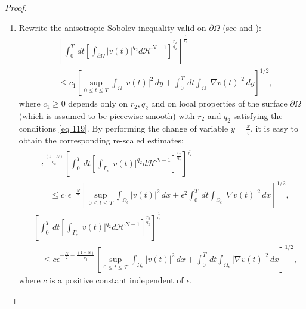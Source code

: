 \begin{proof}
\begin{enumerate}[label=(\roman*)]
\item Rewrite the anisotropic Sobolev inequality valid on $\partial \Omega$ (see \cite{Ladyzenskaja_Solonnikov_Uralceva_1968} and \cite{Nittka_2011}):
\begin{equation}
  \begin{aligned}
&{\left[\int_{0}^{T} \, d  t\left[\int_{\partial \Omega}|v(t)|^{q_{2}} d \mathcal{H}^{N-1}\right]^{\frac{r_{2}}{q_{2}}}\right]^{\frac{1}{r_{2}}}} \\
&\leq c_{1}\left[\sup _{0 \leq t \leq T} \int_{\Omega}|v(t)|^{2} \, d  y+\int_{0}^{T} \, d  t \int_{\Omega}|\nabla v(t)|^{2} \, d  y\right]^{1 / 2},
\end{aligned}
\label{124}\end{equation}
where $c_{1} \geq 0$ depends only on $r_{2}, q_{2}$ and on local properties of the surface $\partial \Omega$ (which is assumed to be piecewise smooth) with $r_{2}$ and $q_{2}$ satisfying the conditions \eqref{eq 119}. By performing the change of variable $y=\frac{x}{\epsilon}$, it is easy to obtain the corresponding re-scaled estimates:
\begin{equation}
  \begin{aligned}
&\epsilon^{\frac{(1-N)}{q_{2}}}\left[\int_{0}^{T} \, d  t\left[\int_{\Gamma_{\epsilon}}|v(t)|^{q_{2}} d \mathcal{H}^{N-1}\right]^{\frac{r_{2}}{q_{2}}}\right]^{\frac{1}{r_{2}}} \\
&\quad \leq c_{1} \epsilon^{-\frac{N}{2}}\left[\sup _{0 \leq t \leq T} \int_{\Omega_{\epsilon}}|v(t)|^{2} \, d  x+\epsilon^{2} \int_{0}^{T} \, d  t \int_{\Omega_{\epsilon}}|\nabla v(t)|^{2} \, d  x\right]^{1 / 2},
\end{aligned}
\label{eq 125}\end{equation}
\begin{equation}
\begin{aligned}
&{\left[\int_{0}^{T} \, d  t\left[\int_{\Gamma_{\epsilon}}|v(t)|^{q_{2}} d \mathcal{H}^{N-1}\right]^{\frac{r_{2}}{q_{2}}}\right]^{\frac{1}{r_{2}}}} \\
&\quad \leq c \epsilon^{-\frac{N}{2}-\frac{(1-N)}{q_{2}}}\left[\sup _{0 \leq t \leq T} \int_{\Omega_{\epsilon}}|v(t)|^{2} \, d  x+\int_{0}^{T} \, d  t \int_{\Omega_{\epsilon}}|\nabla v(t)|^{2} \, d  x\right]^{1 / 2},
\end{aligned}
\label{eq 126}\end{equation}
where $c$ is a positive constant independent of $\epsilon$.
\end{enumerate}
\end{proof}
